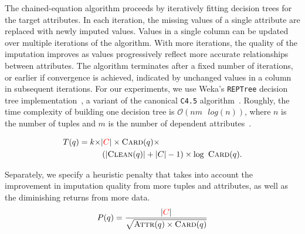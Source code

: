 {%

The chained-equation algorithm proceeds by
iteratively fitting decision trees for the target attributes. 
In each iteration, the missing values of a single attribute are replaced with newly imputed
values. 
Values in a single column can be updated over multiple
iterations of the algorithm. With more iterations, the quality of the
imputation improves as values progressively reflect more accurate relationships
between attributes. The algorithm terminates after a fixed number of
iterations, or earlier if convergence is achieved, indicated by unchanged values in a 
column in subsequent iterations. For our experiments, we use Weka's \texttt{REPTree}
decision tree implementation~\cite{witten2016data}, a variant of the canonical \texttt{C4.5}
algorithm~\cite{quinlan1993}. Roughly, the time complexity of building one
decision tree is $\mathcal{O}(nm \text{ } log(n))$, where $n$ is the number of tuples
and $m$ is the number of dependent attributes~\cite{witten2016data}.

\begin{equation*}
    \begin{aligned}
    T(q) = k \times &|{\color{red}C}| \times \textsc{Card}(q) \times \\
               &\left(|\textsc{Clean}(q)| + |C| - 1\right) \times \log\ \textsc{Card}(q).
    \end{aligned}
\end{equation*}}

Separately, we specify a heuristic penalty that takes into account the
improvement in imputation quality from more tuples and attributes, as well as
the diminishing returns from more data.
\[
    P(q) = \frac{|{\color{red}C}|}{\sqrt{ \textsc{Attr}(q) \times \textsc{Card}(q)}}
\]

